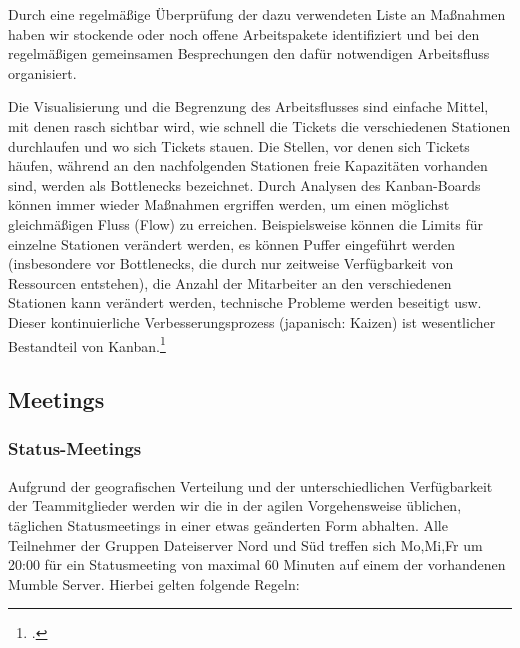 Durch eine regelmäßige Überprüfung der dazu verwendeten Liste an Maßnahmen
haben wir stockende oder noch offene Arbeitspakete identifiziert und bei den
regelmäßigen gemeinsamen Besprechungen den dafür notwendigen Arbeitsfluss
organisiert.

Die Visualisierung und die Begrenzung des Arbeitsflusses sind einfache Mittel,
mit denen rasch sichtbar wird, wie schnell die Tickets die verschiedenen
Stationen durchlaufen und wo sich Tickets stauen. Die Stellen, vor denen sich
Tickets häufen, während an den nachfolgenden Stationen freie Kapazitäten
vorhanden sind, werden als Bottlenecks bezeichnet. Durch Analysen des
Kanban-Boards können immer wieder Maßnahmen ergriffen werden, um einen
möglichst gleichmäßigen Fluss (Flow) zu erreichen. Beispielsweise können die
Limits für einzelne Stationen verändert werden, es können Puffer eingeführt
werden (insbesondere vor Bottlenecks, die durch nur zeitweise Verfügbarkeit von
Ressourcen entstehen), die Anzahl der Mitarbeiter an den verschiedenen
Stationen kann verändert werden, technische Probleme werden beseitigt usw.
Dieser kontinuierliche Verbesserungsprozess (japanisch: Kaizen) ist
wesentlicher Bestandteil von Kanban.\footcite{wikiKanban}\\

\subsection{Meetings}
\subsubsection{Status-Meetings}
Aufgrund der geografischen Verteilung und der unterschiedlichen Verfügbarkeit der Teammitglieder werden wir die in der agilen Vorgehensweise üblichen, täglichen Statusmeetings in einer etwas geänderten Form abhalten. Alle Teilnehmer der Gruppen Dateiserver Nord und Süd treffen sich Mo,Mi,Fr um 20:00 für ein Statusmeeting von maximal 60 Minuten auf einem der vorhandenen Mumble Server. Hierbei gelten folgende Regeln:

